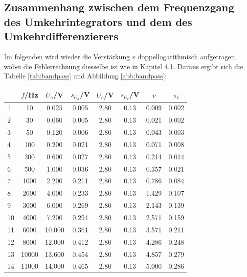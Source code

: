 \subsection*{Zusammenhang zwischen dem Frequenzgang des Umkehrintegrators und dem des Umkehrdifferenzierers}
Im folgenden wird wieder die Verstärkung $v$ doppellogarithmisch aufgetragen, wobei die Fehlerrechnung diesselbe ist wie in Kapitel 4.1. Daraus ergibt sich die Tabelle \ref{tab:bandpass} und Abbildung \ref{abb:bandpass}:
\begin{center}
    \begin{tabular}{l | c c c c c | c c}
        {} &       $f$/Hz &   $U_a$/V &  $s_{U_a}$/V &  $U_e$/V &  $s_{U_e}$/V &      $v$ &    $s_v$ \\
        \hline
        1  &       10 &   0.025 &      0.005 &    2.80 &       0.13 &  0.009 &  0.002 \\
        2  &       30 &   0.060 &      0.005 &    2.80 &       0.13 &  0.021 &  0.002 \\
        3  &       50 &   0.120 &      0.006 &    2.80 &       0.13 &  0.043 &  0.003 \\
        4  &      100 &   0.200 &      0.021 &    2.80 &       0.13 &  0.071 &  0.008 \\
        5  &      300 &   0.600 &      0.027 &    2.80 &       0.13 &  0.214 &  0.014 \\
        6  &      500 &   1.000 &      0.036 &    2.80 &       0.13 &  0.357 &  0.021 \\
        7  &     1000 &   2.200 &      0.211 &    2.80 &       0.13 &  0.786 &  0.084 \\
        8  &     2000 &   4.000 &      0.233 &    2.80 &       0.13 &  1.429 &  0.107 \\
        9  &     3000 &   6.000 &      0.269 &    2.80 &       0.13 &  2.143 &  0.139 \\
        10 &     4000 &   7.200 &      0.294 &    2.80 &       0.13 &  2.571 &  0.159 \\
        11 &     6000 &  10.000 &      0.361 &    2.80 &       0.13 &  3.571 &  0.211 \\
        12 &     8000 &  12.000 &      0.412 &    2.80 &       0.13 &  4.286 &  0.248 \\
        13 &    10000 &  13.600 &      0.454 &    2.80 &       0.13 &  4.857 &  0.279 \\
        14 &    11000 &  14.000 &      0.465 &    2.80 &       0.13 &  5.000 &  0.286 \\

\end{tabular}
\end{center}
